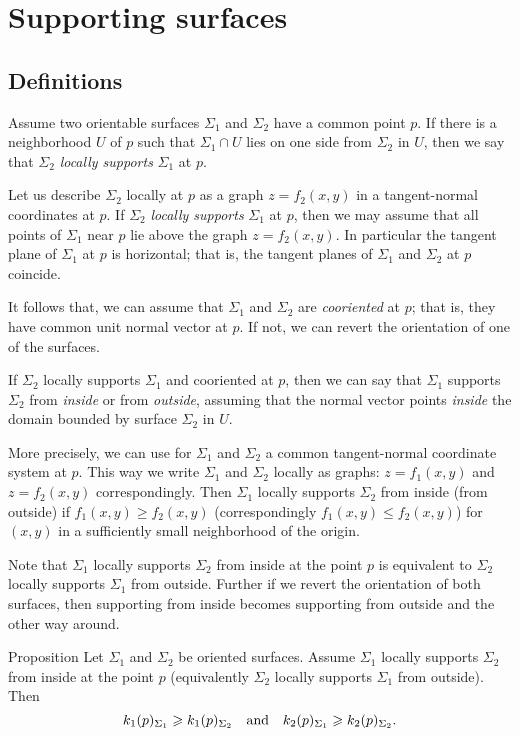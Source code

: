 \chapter{Supporting surfaces}

\section*{Definitions}

Assume two orientable surfaces $\Sigma_1$ and $\Sigma_2$ have a common point $p$.
If there is a neighborhood $U$ of $p$ such that $\Sigma_1\cap U$ lies on one side from $\Sigma_2$ in $U$, then we say that $\Sigma_2$ \emph{locally supports} $\Sigma_1$ at $p$.

Let us describe $\Sigma_2$ locally at $p$ as a graph $z=f_2(x,y)$ in a tangent-normal coordinates at $p$.
If $\Sigma_2$ \emph{locally supports} $\Sigma_1$ at $p$, then we may assume that all points of $\Sigma_1$ near $p$ lie above the graph $z=f_2(x,y)$.
In particular the tangent plane of $\Sigma_1$ at $p$ is horizontal;
that is, the tangent planes of $\Sigma_1$ and $\Sigma_2$ at $p$ coincide.

It follows that, we can assume that $\Sigma_1$ and $\Sigma_2$ are \emph{cooriented} at $p$;
that is, they have common unit normal vector at $p$.
If not, we can revert the orientation of one of the surfaces.

If $\Sigma_2$ locally supports $\Sigma_1$ and cooriented at $p$,
then we can say that $\Sigma_1$ supports $\Sigma_2$ from \emph{inside} or from \emph{outside},
assuming that the normal vector points \emph{inside} the domain bounded by surface $\Sigma_2$ in $U$.

More precisely, we can use for $\Sigma_1$ and $\Sigma_2$ a common tangent-normal coordinate system at $p$.
This way we write $\Sigma_1$ and $\Sigma_2$ locally as graphs: $z=f_1(x,y)$  and $z=f_2(x,y)$ correspondingly.
Then $\Sigma_1$ locally supports $\Sigma_2$ from inside (from outside)  if $f_1(x,y)\ge f_2(x,y)$ (correspondingly $f_1(x,y)\le f_2(x,y)$) for $(x,y)$ in a sufficiently small neighborhood of the origin.

Note that $\Sigma_1$ locally supports $\Sigma_2$ from inside at the point $p$ is equivalent to $\Sigma_2$ locally supports $\Sigma_1$ from outside.
Further if we revert the orientation of both surfaces, then supporting from inside becomes supporting from outside and the other way around.


\begin{thm}{Proposition}\label{prop:surf-support}
Let $\Sigma_1$ and $\Sigma_2$ be oriented surfaces.
Assume $\Sigma_1$ locally supports $\Sigma_2$ from inside at the point $p$ (equivalently $\Sigma_2$ locally supports $\Sigma_1$ from outside).
Then 
\[k_1(p)_{\Sigma_1}\ge k_1(p)_{\Sigma_2}\quad\text{and}\quad k_2(p)_{\Sigma_1}\z\ge k_2(p)_{\Sigma_2}.\]
\end{thm}

